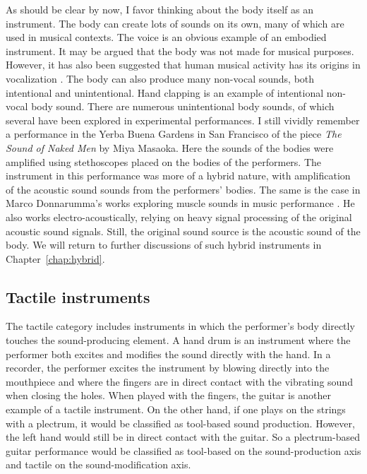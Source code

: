 As should be clear by now, I favor thinking about the body itself as an instrument. The body can create lots of sounds on its own, many of which are used in musical contexts. The voice is an obvious example of an embodied instrument. It may be argued that the body was not made for musical purposes. However, it has also been suggested that human musical activity has its origins in vocalization \citep{mithen_singing_2006}. The body can also produce many non-vocal sounds, both intentional and unintentional. Hand clapping is an example of intentional non-vocal body sound. There are numerous unintentional body sounds, of which several have been explored in experimental performances. I still vividly remember a performance in the Yerba Buena Gardens in San Francisco of the piece \emph{The Sound of Naked Men} by Miya Masaoka. Here the sounds of the bodies were amplified using stethoscopes placed on the bodies of the performers. The instrument in this performance was more of a hybrid nature, with amplification of the acoustic sound sounds from the performers' bodies. The same is the case in Marco Donnarumma's works exploring muscle sounds in music performance \citep{donnarumma_configuring_2016}. He also works electro-acoustically, relying on heavy signal processing of the original acoustic sound signals. Still, the original sound source is the acoustic sound of the body. We will return to further discussions of such hybrid instruments in Chapter~\ref{chap:hybrid}.


\subsection{Tactile instruments}

The tactile category includes instruments in which the performer's body directly touches the sound-producing element. A hand drum is an instrument where the performer both excites and modifies the sound directly with the hand. In a recorder, the performer excites the instrument by blowing directly into the mouthpiece and where the fingers are in direct contact with the vibrating sound when closing the holes. When played with the fingers, the guitar is another example of a tactile instrument. On the other hand, if one plays on the strings with a plectrum, it would be classified as tool-based sound production. However, the left hand would still be in direct contact with the guitar. So a plectrum-based guitar performance would be classified as tool-based on the sound-production axis and tactile on the sound-modification axis.


